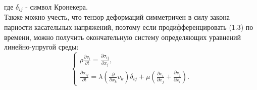 \documentclass[12pt,a4paper, titlepage, openany]{book}
\begin{document}
где $\delta_{ij}$ - символ Кронекера. 
\\
Также можно учесть, что тензор деформаций симметричен в силу закона парности касательных напряжений, поэтому если продифференцировать (1.3) по времени, можно получить окончательную систему определяющих уравнений линейно-упругой среды:
\begin{equation}
\begin{cases}
\rho \frac{\partial v_i}{\partial t} = \frac{\partial \sigma_{ij}}{\partial x_j}, \\
\frac{\partial \sigma_{ij}}{\partial t} = \lambda(\frac{\partial}{\partial x_k} v_k) \delta_{ij} + \mu(\frac{\partial v_i}{\partial x_j} + \frac{\partial v_j}{\partial x_i}).
\end{cases}
\end{equation}
\end{document}
